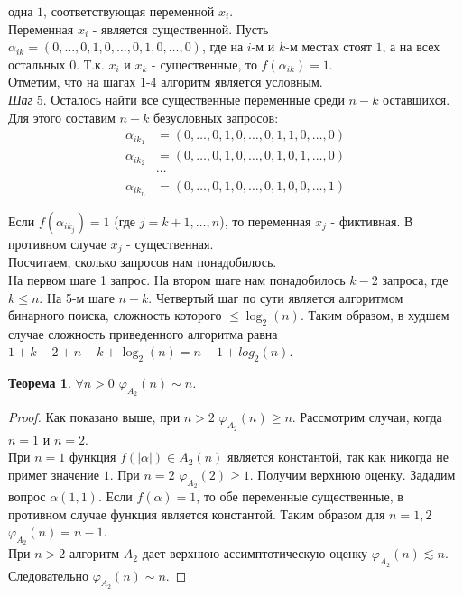 \documentclass[oneside, final, 14pt]{extreport}
\newtheorem{thm}{Теорема}
\begin{document}
	 одна $1$, соответствующая переменной $x_i$. \\
	 Переменная $x_i$ - является существенной. Пусть $\alpha_{ik} = (0, \ldots,0, 1, 0, \ldots, 0, 1, 0, \ldots, 0)$, где на $i$-м и  $k$-м местах стоят $1$, а на всех 
	 остальных $0$. Т.к. $x_i$ и $x_k$ - существенные, то  $f(\alpha_{ik}) = 1$. \\
	 Отметим, что на шагах 1-4 алгоритм является условным.\\
	 \emph{Шаг} 5. Осталось найти все существенные переменные среди $n-k$ оставшихся. Для этого составим $n-k$ безусловных запросов: 
	 \begin{displaymath}
	 \begin{aligned}
	 	\alpha_{ik_1} & = (0, \ldots,0, 1, 0, \ldots, 0, 1, 1, 0, \ldots, 0) \\
	 	\alpha_{ik_2} & = (0, \ldots,0, 1, 0, \ldots, 0, 1, 0, 1, \ldots, 0) \\
	 	                    & \cdots \\
	 	\alpha_{ik_n} & = (0, \ldots,0, 1, 0, \ldots, 0, 1, 0, 0, \ldots, 1)
	 \end{aligned}
	 \end{displaymath}
	
	Если $f(\alpha_{ik_j}) = 1$ (где $j = k+1, \ldots, n$), то переменная $x_j$ - фиктивная. В противном случае $x_j$ - существенная.\\
	Посчитаем, сколько запросов нам понадобилось. \\
	На первом шаге 1 запрос. На втором шаге нам понадобилось $k-2$ запроса, где $k \leq n$. На 5-м шаге  $n-k$. Четвертый шаг по сути является
	алгоритмом бинарного поиска, сложность которого $ \leq \log_2(n)$. Таким образом, в худшем случае сложность приведенного алгоритма равна 
	$1 + k - 2 + n - k + \log_2(n) = n - 1 + log_2(n)$. %
	
	\begin{thm} 
		$\forall n > 0$ $\varphi_{A_2}(n) \sim n$.
	\end{thm}
	\begin{proof}
		Как показано выше, при $n > 2$ $\varphi_{A_2}(n) \geq n$. Рассмотрим случаи, когда $n=1$ и $n=2$. \\
	    При $n = 1$ функция $f(|\alpha|) \in A_2(n)$ является константой, так как никогда не примет значение $1$. При $n=2$ $\varphi_{A_2}(2) \geq 1$. 
	    Получим верхнюю оценку. Зададим вопрос $\alpha(1, 1).$ Если $f(\alpha) = 1$, то обе переменные существенные, в противном случае функция является
	    константой. Таким образом для $n = 1,2$  $\varphi_{A_2}(n) = n-1$.\\
	    При $n > 2$ алгоритм $A_2$ дает верхнюю ассимптотическую  оценку $\varphi_{A_2}(n) \lesssim n$. Следовательно $\varphi_{A_2}(n) \sim n$.
	\end{proof}
	
\end{document}
